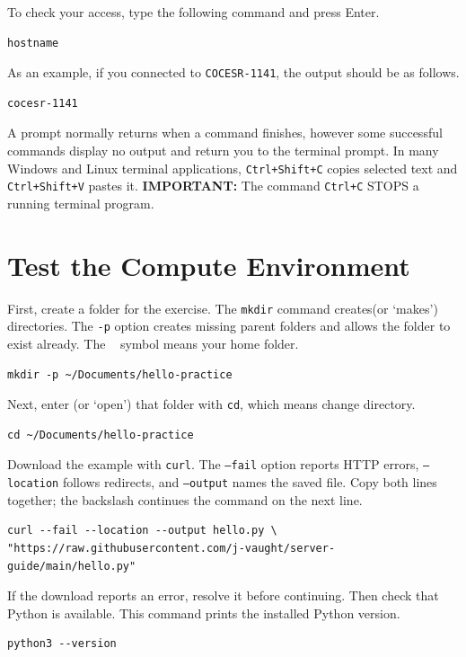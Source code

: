 \documentclass[12pt]{article}
\newcommand{\keyshortcut}[1]{\begingroup\setlength{\fboxsep}{2pt}%
  \colorbox{ShortcutBackground}{\texttt{#1}}\endgroup}
\newcommand{\program}[1]{\begingroup\setlength{\fboxsep}{2pt}%
  \colorbox{ProgramBackground}{\texttt{#1}}\endgroup}
\newcommand{\inlinecode}[1]{\begingroup\setlength{\fboxsep}{2pt}%
  \colorbox{black!5}{\texttt{#1}}\endgroup}
\begin{document}
To check your access, type the following command and press Enter.

\begin{lstlisting}
hostname
\end{lstlisting}

As an example, if you connected to \inlinecode{COCESR-1141}, the output should be as follows.

\begin{lstlisting}[style=output]
cocesr-1141
\end{lstlisting}

A prompt normally returns when a command finishes, however some successful commands display no output and return you to the terminal prompt. In many Windows and Linux terminal applications, \keyshortcut{Ctrl+Shift+C} copies selected text and \keyshortcut{Ctrl+Shift+V} pastes it. \textbf{IMPORTANT:} The command \keyshortcut{Ctrl+C} STOPS a running terminal program. 

\section*{Test the Compute Environment}

First, create a folder for the exercise. The \inlinecode{mkdir} command creates(or `makes') directories. The \inlinecode{-p} option creates missing parent folders and allows the folder to exist already. The \inlinecode{\string~} symbol means your home folder.
\begin{lstlisting}
mkdir -p ~/Documents/hello-practice
\end{lstlisting}

Next, enter (or `open') that folder with \inlinecode{cd}, which means change directory.
\begin{lstlisting}
cd ~/Documents/hello-practice
\end{lstlisting}

Download the example with \program{curl}. The \inlinecode{--fail} option reports HTTP errors, \inlinecode{--location} follows redirects, and \inlinecode{--output} names the saved file. Copy both lines together; the backslash continues the command on the next line.
\begin{lstlisting}
curl --fail --location --output hello.py \
"https://raw.githubusercontent.com/j-vaught/server-guide/main/hello.py"
\end{lstlisting}

If the download reports an error, resolve it before continuing. Then check that Python is available. This command prints the installed Python version.
\begin{lstlisting}
python3 --version
\end{lstlisting}
\end{document}
